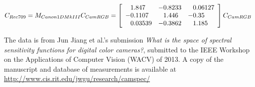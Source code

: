 \begin{displaymath}
C_{Rec709} = M_{Canon1DMkIII} C_{CamRGB} = \left[\begin{array}{r@{.}lr@{.}lr@{.}l}
 1&847   & -0&8233 &  0&06127  \\
-0&1107  &  1&446  & -0&35 \\
 0&03539 & -0&3862 &  1&185  \\
\end{array}\right] C_{CamRGB}
\end{displaymath}

The data is from Jun Jiang et al.'s submission \textit{What is the space of spectral sensitivity
functions for digital color cameras?}, submitted to the IEEE Workshop on the Applications of Computer
Vision (WACV) of 2013.
A copy of the manuscript and database of measurements is available at 
\url{http://www.cis.rit.edu/jwgu/research/camspec/}

